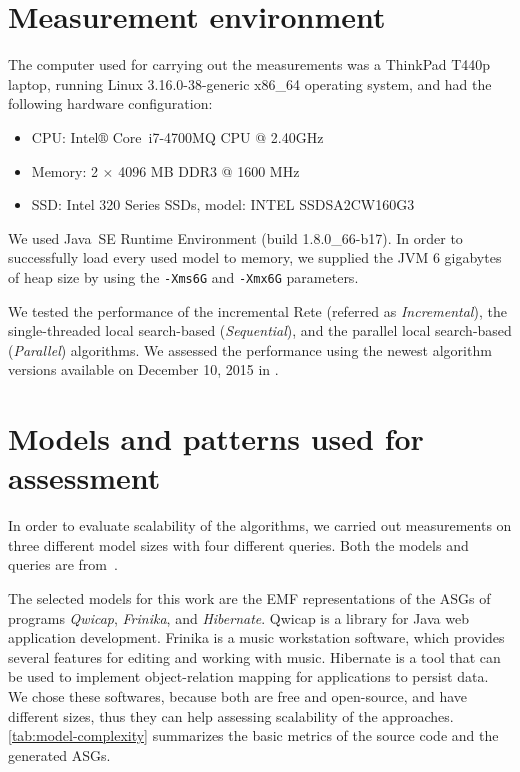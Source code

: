 
\section{Measurement environment}
\label{sec:meas-env}

The computer used for carrying out the measurements was a ThinkPad T440p laptop, running Linux 3.16.0-38-generic x86\_64 operating system, and had the following hardware configuration:
\begin{itemize}
	\item CPU: Intel$\circledR$ Core\texttrademark~i7-4700MQ CPU @ 2.40GHz
	\item Memory: 2 $\times$ 4096 MB DDR3 @ 1600 MHz
	\item SSD: Intel 320 Series SSDs, model: INTEL SSDSA2CW160G3
\end{itemize}

We used Java\texttrademark~SE Runtime Environment (build 1.8.0\_66-b17). In order to successfully load every used model to memory, we supplied the JVM 6 gigabytes of heap size by using the \texttt{-Xms6G} and \texttt{-Xmx6G} parameters. 

We tested the performance of the incremental Rete (referred as \emph{Incremental}), the single-threaded local search-based (\emph{Sequential}), and the parallel local search-based (\emph{Parallel}) algorithms. We assessed the performance using the newest algorithm versions available on December 10, 2015 in \eiq.


\section{Models and patterns used for assessment}
\label{sec:meas-patterns}
In order to evaluate scalability of the algorithms, we carried out measurements on three different model sizes with four different queries. Both the models and queries are from~\cite{DBLP:journals/infsof/UjhelyiSHCVVF15}. 

The selected models for this work are the EMF representations of the ASGs of programs \emph{Qwicap}, \emph{Frinika}, and \emph{Hibernate}. Qwicap is a library for Java web application development. Frinika is a music workstation software, which provides several features for editing and working with music. Hibernate is a tool that can be used to implement object-relation mapping for applications to persist data. We chose these softwares, because both are free and open-source, and have different sizes, thus they can help assessing scalability of the approaches. \autoref{tab:model-complexity} summarizes the basic metrics of the source code and the generated ASGs.

